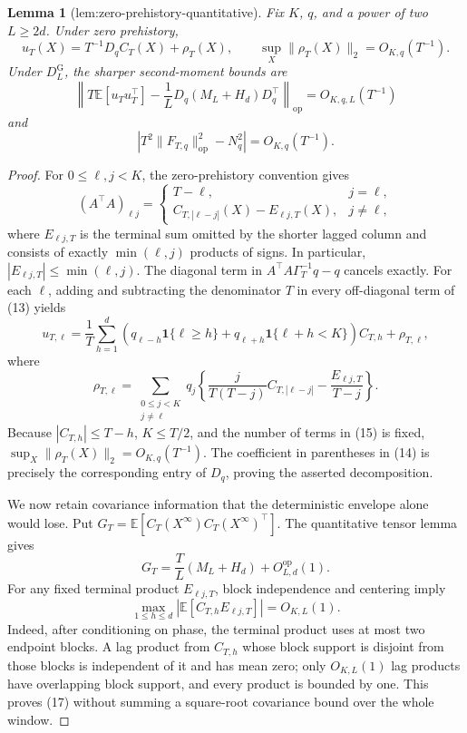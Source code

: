\documentclass{article}
\newtheorem{lemma}{Lemma}
\begin{document}
\begin{lemma}[lem:zero-prehistory-quantitative]\label{lem:zero-prehistory-quantitative}
Fix \(K\), \(q\), and a power of two \(L\ge2d\).  Under zero prehistory,
\[
u_T(X)=T^{-1}D_qC_T(X)+\rho_T(X),
\qquad \sup_X\|\rho_T(X)\|_2=O_{K,q}(T^{-1}).
\]
Under \(D_L^{\mathrm G}\), the sharper second-moment bounds are
\[
\left\|T\mathbb E[u_Tu_T^{\top}]
-\frac1L D_q(M_L+H_d)D_q^{\top}\right\|_{\mathrm{op}}
=O_{K,q,L}(T^{-1})
\]
and
\[
\left|T^2\|F_{T,q}\|_{\mathrm{op}}^2-N_q^2\right|
=O_{K,q}(T^{-1}).
\]
\end{lemma}
\begin{proof}
For \(0\le\ell,j<K\), the zero-prehistory convention gives
\[
(A^{\top}A)_{\ell j}
=\begin{cases}
T-\ell,&j=\ell,\\
C_{T,|\ell-j|}(X)-E_{\ell j,T}(X),&j\ne\ell,
\end{cases} \tag{13}
\]
where \(E_{\ell j,T}\) is the terminal sum omitted by the shorter lagged column and consists of exactly \(\min(\ell,j)\) products of signs.  In particular, \(|E_{\ell j,T}|\le\min(\ell,j)\).  The diagonal term in \(A^{\top}A\Gamma_T^{-1}q-q\) cancels exactly.  For each \(\ell\), adding and subtracting the denominator \(T\) in every off-diagonal term of (13) yields
\[
u_{T,\ell}=\frac1T\sum_{h=1}^d
\left(q_{\ell-h}\mathbf 1\{\ell\ge h\}
+q_{\ell+h}\mathbf 1\{\ell+h<K\}\right)C_{T,h}+\rho_{T,\ell}, \tag{14}
\]
where
\[
\rho_{T,\ell}
=\sum_{\substack{0\le j<K\\j\ne\ell}}q_j
\left\{\frac{j}{T(T-j)}C_{T,|\ell-j|}
-\frac{E_{\ell j,T}}{T-j}\right\}. \tag{15}
\]
Because \(|C_{T,h}|\le T-h\), \(K\le T/2\), and the number of terms in (15) is fixed, \(\sup_X\|\rho_T(X)\|_2=O_{K,q}(T^{-1})\).  The coefficient in parentheses in (14) is precisely the corresponding entry of \(D_q\), proving the asserted decomposition.

We now retain covariance information that the deterministic envelope alone would lose.  Put \(G_T=\mathbb E[C_T(X^{\infty})C_T(X^{\infty})^{\top}]\).  The quantitative tensor lemma gives
\[
G_T=\frac TL(M_L+H_d)+O_{L,d}^{\mathrm{op}}(1). \tag{16}
\]
For any fixed terminal product \(E_{\ell j,T}\), block independence and centering imply
\[
\max_{1\le h\le d}\left|\mathbb E[C_{T,h}E_{\ell j,T}]\right|=O_{K,L}(1). \tag{17}
\]
Indeed, after conditioning on phase, the terminal product uses at most two endpoint blocks.  A lag product from \(C_{T,h}\) whose block support is disjoint from those blocks is independent of it and has mean zero; only \(O_{K,L}(1)\) lag products have overlapping block support, and every product is bounded by one.  This proves (17) without summing a square-root covariance bound over the whole window.


\end{proof}
\end{document}
